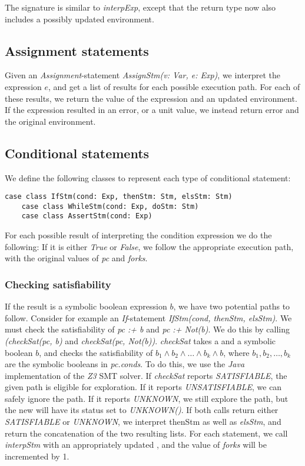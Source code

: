 The signature is similar to \textsl{interpExp}, except that the return type now also includes a possibly updated environment. 

\subsection{Assignment statements}
Given an \textsl{Assignment}-statement \textsl{AssignStm(v: Var, e: Exp)}, we interpret the expression $e$, and get a list of results for each possible execution path. For each of these results, we return the value of the expression and an updated environment. If the expression resulted in an error, or a unit value, we instead return error and the original environment. 

\subsection{Conditional statements}

We define the following classes to represent each type of conditional statement:

\begin{lstlisting}[style=simple]
	case class IfStm(cond: Exp, thenStm: Stm, elsStm: Stm)
	case class WhileStm(cond: Exp, doStm: Stm)
	case class AssertStm(cond: Exp)
\end{lstlisting}
For each possible result of interpreting the condition expression we do the following: If it is either \textsl{True} or \textsl{False}, we follow the appropriate execution path, with the original values of \textsl{pc} and \textsl{forks}. 

\subsubsection{Checking satisfiability}
If the result is a symbolic boolean expression $b$, we have two potential paths to follow. Consider for example an \textsl{If}-statement \textsl{IfStm(cond, thenStm, elsStm)}. We must check the satisfiability of \textsl{pc :+ b} and \textsl{pc :+ Not(b)}. We do this by calling \textsl{(checkSat(pc, b)} and \textsl{checkSat(pc, Not(b))}. \textsl{checkSat} takes a \pc  and a symbolic boolean $b$, and checks the satisfiability of $b_1 \land b_2 \land \ldots \land b_k \land b$, where $b_1, b_2, \ldots, b_k$ are the symbolic booleans in \textsl{pc.conds}. To do this, we use the \textsl{Java} implementation of the \textsl{Z3} SMT solver. If \textsl{checkSat} reports \textsl{SATISFIABLE}, the given path is eligible for exploration. If it reports \textsl{UNSATISFIABLE}, we can safely ignore the path. If it reports \textsl{UNKNOWN}, we still explore the path, but the new \pc will have its status set to \textsl{UNKNOWN()}. If both calls return either \textsl{SATISFIABLE} or \textsl{UNKNOWN}, we interpret {thenStm} as well as \textsl{elsStm}, and return the concatenation of the two resulting lists. For each statement, we call \textsl{interpStm} with an appropriately updated \pc, and the value of \textsl{forks} will be incremented by 1.

